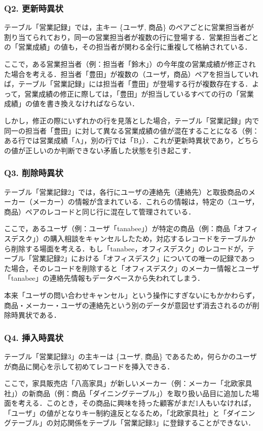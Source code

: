 \subsubsection*{Q2. 更新時異状}
テーブル「営業記録」では，主キー \{ユーザ, 商品\} のペアごとに営業担当者が割り当てられており，同一の営業担当者が複数の行に登場する．営業担当者ごとの「営業成績」の値も，その担当者が関わる全行に重複して格納されている．

ここで，ある営業担当者（例：担当者「鈴木」）の今年度の営業成績が修正された場合を考える．担当者「豊田」が複数の（ユーザ，商品）ペアを担当していれば，テーブル「営業記録」には担当者「豊田」が登場する行が複数存在する．よって，営業成績の修正に際しては，「豊田」が担当しているすべての行の「営業成績」の値を書き換えなければならない．

しかし，修正の際にいずれかの行を見落とした場合，テーブル「営業記録」内で同一の担当者「豊田」に対して異なる営業成績の値が混在することになる（例：ある行では営業成績「A」，別の行では「B」）．これが更新時異状であり，どちらの値が正しいのか判断できない矛盾した状態を引き起こす．

\subsubsection*{Q3. 削除時異状}
テーブル「営業記録2」では，各行にユーザの連絡先（連絡先）と取扱商品のメーカー（メーカー）の情報が含まれている．これらの情報は，特定の（ユーザ，商品）ペアのレコードと同じ行に混在して管理されている．

ここで，あるユーザ（例：ユーザ「tanabee」）が特定の商品（例：商品「オフィスデスク」）の購入相談をキャンセルしたため，対応するレコードをテーブルから削除する場面を考える．もし「tanabee，オフィスデスク」のレコードが，テーブル「営業記録2」における「オフィスデスク」についての唯一の記録であった場合，そのレコードを削除すると「オフィスデスク」のメーカー情報とユーザ「tanabee」の連絡先情報もデータベースから失われてしまう．

本来「ユーザの問い合わせキャンセル」という操作にすぎないにもかかわらず，商品・メーカー・ユーザの連絡先という別のデータが意図せず消去されるのが削除時異状である．

\subsubsection*{Q4. 挿入時異状}
テーブル「営業記録3」の主キーは \{ユーザ, 商品\} であるため，何らかのユーザが商品に関心を示して初めてレコードを挿入できる．

ここで，家具販売店「八高家具」が新しいメーカー（例：メーカー「北欧家具社」）の新商品（例：商品「ダイニングテーブル」）を取り扱い品目に追加した場面を考える．このとき，その商品に興味を持った顧客がまだ1人もいなければ，「ユーザ」の値がとなりキー制約違反となるため，「北欧家具社」と「ダイニングテーブル」の対応関係をテーブル「営業記録3」に登録することができない．

